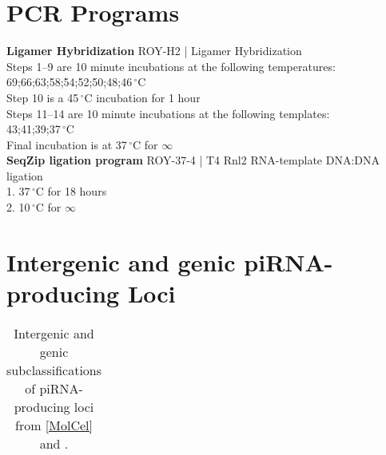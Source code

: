 \section{PCR Programs}\label{AppendixMisc:sec:PCR Programs}

\textbf{Ligamer Hybridization}
ROY-H2 | Ligamer Hybridization\\
  Steps 1–9 are 10 minute incubations at the following temperatures:\\
  69;66;63;58;54;52;50;48;46$\,^{\circ}\mathrm{C}$\\
  Step 10 is a 45$\,^{\circ}\mathrm{C}$ incubation for 1 hour\\
  Steps 11–14 are 10 minute incubations at the following templates:\\
  43;41;39;37$\,^{\circ}\mathrm{C}$\\
  Final incubation is at 37$\,^{\circ}\mathrm{C}$ for $\infty$\\

\textbf{SeqZip ligation program}
ROY-37-4 | T4 Rnl2 RNA-template DNA:DNA ligation\\
  1. 37$\,^{\circ}\mathrm{C}$ for 18 hours\\
  2. 10$\,^{\circ}\mathrm{C}$ for $\infty$ \\

\section{Intergenic and genic piRNA-producing Loci}



\begin{longtable}{c|c} %
  \caption[Intergenic and genic subclassifications of piRNA-producing loci]
  {Intergenic and genic subclassifications of piRNA-producing loci from \ref{MolCel} and \citep{Li2013e}.}
  \label{Appendix:tab:GenicAndInterGenicLoci}
  
  \end{longtable}

